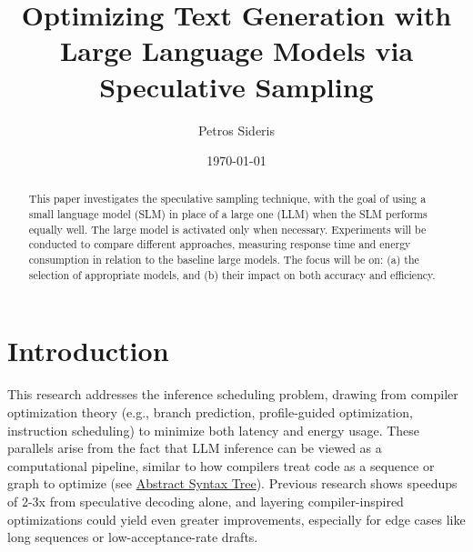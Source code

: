 \documentclass[a4paper,12pt]{report}
\title{Optimizing Text Generation with Large Language Models via Speculative Sampling}
\author{Petros Sideris}
\date{\today}
\begin{document}
\maketitle

\begin{abstract}
This paper investigates the speculative sampling technique, with the goal of using a small language model (SLM) in place of a large one (LLM) when the SLM performs equally well. The large model is activated only when necessary. Experiments will be conducted to compare different approaches, measuring response time and energy consumption in relation to the baseline large models. The focus will be on: (a) the selection of appropriate models, and (b) their impact on both accuracy and efficiency.
\end{abstract}

\tableofcontents

\chapter{Introduction}
This research addresses the inference scheduling problem, drawing from compiler optimization theory (e.g., branch prediction, profile-guided optimization, instruction scheduling) to minimize both latency and energy usage. These parallels arise from the fact that LLM inference can be viewed as a computational pipeline, similar to how compilers treat code as a sequence or graph to optimize (see \href{https://en.wikipedia.org/wiki/Abstract_syntax_tree}{Abstract Syntax Tree}). Previous research shows speedups of 2-3x from speculative decoding alone, and layering compiler-inspired optimizations could yield even greater improvements, especially for edge cases like long sequences or low-acceptance-rate drafts.
\end{document}
